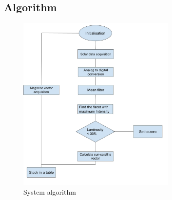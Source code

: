 \documentclass[a4paper, 12pt]{article}
\begin{document}
\subsection{Algorithm}
\begin{figure}[H]  %
    \centering
    \includegraphics[width=0.7\textwidth]{fig/Algorithme.png}
    \caption{System algorithm}
    \label{fig:System algorithm}
\end{figure}
\end{document}
